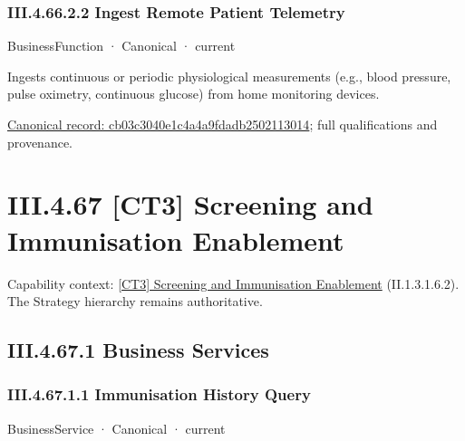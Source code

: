 \subsubsection*{III.4.66.2.2 Ingest Remote Patient Telemetry}
\label{navigation:III.4.66.2.2}

\label{element:cb03c3040e1c4a4a9fdadb2502113014}
{\small BusinessFunction · Canonical · current}\par

Ingests continuous or periodic physiological measurements (e.g., blood pressure, pulse oximetry, continuous glucose) from home monitoring devices.


{\footnotesize \href{../../../../continuum/business/business-function/cb03c3040e1c4a4a9fdadb2502113014.md}{Canonical record: cb03c3040e1c4a4a9fdadb2502113014}; full qualifications and provenance.}\par
\section*{III.4.67 [CT3] Screening and Immunisation Enablement}
\label{navigation:III.4.67}

{\small Capability context: \hyperref[element:3e9016eaebae4ed0b67a5cacba2652f5]{[CT3] Screening and Immunisation Enablement} (II.1.3.1.6.2). The Strategy hierarchy remains authoritative.}\par
\subsection*{III.4.67.1 Business Services}
\label{navigation:III.4.67.1}

\subsubsection*{III.4.67.1.1 Immunisation History Query}
\label{navigation:III.4.67.1.1}

\label{element:f2a0107d73664aa0be9d6695fc455d74}
{\small BusinessService · Canonical · current}\par

